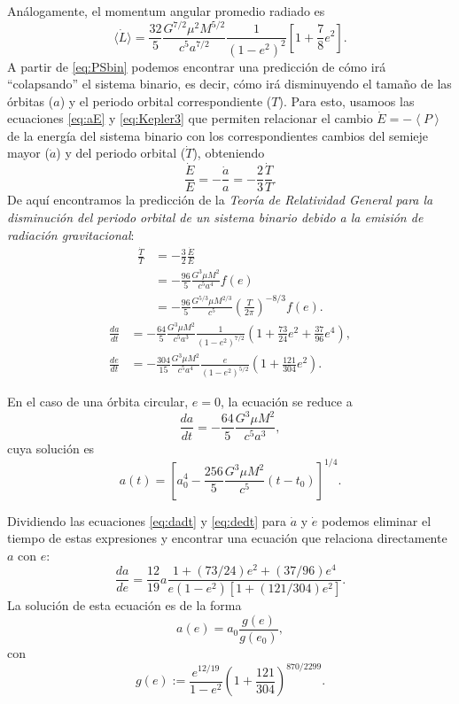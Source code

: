 Análogamente, el momentum angular promedio radiado es
\begin{equation*}
\langle\dot{L}\rangle=\frac{32}{5}\frac{G^{7/2}\mu^{2}M^{5/2}}{c^5a^{7/2}}\frac{1}{(1-e^{2})^{2}}\left[1+\displaystyle\frac{7}{8}e^{2}\right].
\end{equation*}
A partir de \ref{eq:PSbin} podemos encontrar una predicción de cómo irá ``colapsando'' el sistema binario, es decir, 
cómo irá disminuyendo el tamaño de las órbitas ($a$) y el periodo orbital correspondiente ($T$). Para esto, usamoos las ecuaciones
 \ref{eq:aE} y \ref{eq:Kepler3} que permiten relacionar el cambio $\dot{E}=-\left\langle P\right\rangle$ de la energía del sistema binario con los correspondientes cambios del semieje mayor ($\dot{a}$) y del periodo orbital ($\dot{T}$), obteniendo
\begin{equation*}
\frac{\dot{E}}{E}=-\frac{\dot{a}}{a}=-\frac{2}{3}\frac{\dot{T}}{T}.
\end{equation*}
De aquí encontramos la predicción de la \textit{Teoría de Relatividad General para la disminución del periodo orbital de un sistema binario debido a la emisión de radiación gravitacional}:
\begin{align*}
\frac{\dot{T}}{T} &= -\frac{3}{2}\frac{\dot{E}}{E} \\
&= -\frac{96}{5} \frac{G^3\mu M^2}{c^5a^4}f(e) \\
&= -\frac{96}{5} \frac{G^{5/3}\mu M^{2/3}}{c^5}\left(\frac{T}{2\pi}\right)^{-8/3}f(e).
\end{align*}
\begin{align}
\frac{da}{dt} &= -\frac{64}{5}\frac{G^3\mu M^2}{c^5a^3}\frac{1}{\left(1-e^2\right)^{7/2}}\left(1+\frac{73}{24}e^2+\frac{37}{96}e^4\right) \label{eq:dadt},\\
\frac{de}{dt} &= -\frac{304}{15}\frac{G^3\mu M^2}{c^5a^4}\frac{e}{\left(1-e^2\right)^{5/2}}\left(1+\frac{121}{304}e^2\right). \label{eq:dedt}
\end{align}

En el caso de una órbita circular, $e=0$, la ecuación se reduce a
\begin{equation}
\frac{da}{dt} = -\frac{64}{5}\frac{G^3\mu M^2}{c^5a^3},
\end{equation}
cuya solución es
\begin{equation}
a(t) = \left[a_0^4-\frac{256}{5}\frac{G^3\mu M^2}{c^5}(t-t_0)\right]^{1/4}.
\end{equation}

Dividiendo las ecuaciones \ref{eq:dadt} y \ref{eq:dedt} para $\dot{a}$ y $\dot{e}$ podemos eliminar el tiempo de estas expresiones y encontrar una ecuación que relaciona directamente $a$ con $e$:
\begin{equation}
\frac{da}{de}=\frac{12}{19}a\frac{1+(73/24)e^2+(37/96)e^4}{e(1-e^2)[1+(121/304)e^2]}.
\label{eq:dade}
\end{equation}
La solución de esta ecuación es de la forma
\begin{equation*}
a(e)=a_{0}\frac{g(e)}{g(e_{0})},
\end{equation*}
con 
\begin{equation*}
g(e):= \frac{e^{12/19}}{1-e^2}\left(1+\frac{121}{304} \right)^{870/2299}.
\end{equation*}